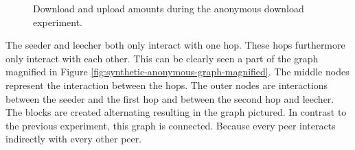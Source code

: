 \begin{figure}
\centering
{}
\caption{Download and upload amounts during the anonymous download experiment.}
\label{fig:synthetic-anonymous-amounts}
\end{figure}

The seeder and leecher both only interact with one hop.
These hops furthermore only interact with each other.
This can be clearly seen a part of the graph magnified in Figure \ref{fig:synthetic-anonymous-graph-magnified}.
The middle nodes represent the interaction between the hops.
The outer nodes are interactions between the seeder and the first hop and between the second hop and leecher.
The blocks are created alternating resulting in the graph pictured.
In contrast to the previous experiment, this graph is connected.
Because every peer interacts indirectly with every other peer.

